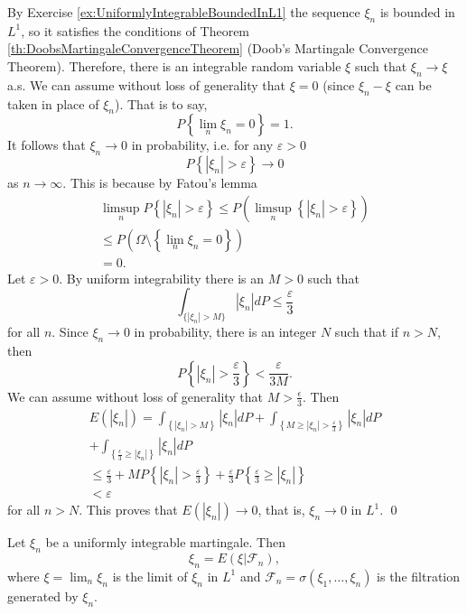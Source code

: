 \begin{Proof}
By Exercise \ref{ex:UniformlyIntegrableBoundedInL1} the sequence $\xi_{n}$ is bounded in $L^1$, so it satisfies the conditions of Theorem \ref{th:DoobsMartingaleConvergenceTheorem} (Doob's Martingale Convergence Theorem). Therefore, there is an integrable random variable $\xi$ such that $\xi_{n} \to \xi$ a.s. We can assume without loss of generality that $\xi = 0$ (since $\xi_{n} - \xi$ can be taken in place of $\xi_{n}$). That is to say,
\[
P \left\{\lim_{n} \xi_{n} = 0 \right\} = 1.
\]
It follows that $\xi_{n}\to 0$ in probability, i.e. for any $\varepsilon >0$
\[
P \left\{\left| \xi_{n} \right| > \varepsilon \right\}\rightarrow 0
\]
as $n \to \infty$. This is because by Fatou's lemma
\[
\begin{array}{l}
\limsup_{n} P \left\{\left| \xi_{n} \right| > \varepsilon \right\} \leq P \left(\limsup_{n} \left\{\left| \xi_{n} \right| > \varepsilon \right\}\right) \\
\leq P \left(\Omega \setminus \left\{\lim_{n} \xi_{n} = 0 \right\}\right) \\
= 0.
\end{array}
\]
Let $\varepsilon > 0$. By uniform integrability there is an $M > 0$ such that
\[
\int_{\{| \xi_{n} | > M \}} | \xi_{n} | d P \leq \frac{\varepsilon}{3}
\]
for all $n$. Since $\xi_n \to 0$ in probability, there is an integer $N$ such that if $n > N$, then
\[
P \left\{\left| \xi_{n} \right| > \frac{\varepsilon}{3} \right\} < \frac{\varepsilon}{3 M}.
\]
We can assume without loss of generality that $M > \frac{\epsilon}{3}$. Then
\[
\begin{array}{l}
E \left(\left| \xi_{n} \right|\right) = \int_{\left\{\left| \xi_{n} \right| > M \right\}} \left| \xi_{n} \right| d P + \int_{\left\{M \geq \left| \xi_{n} \right| > \frac{\varepsilon}{3} \right\}} \left| \xi_{n} \right| d P \\
+ \int_{\left\{\frac{\epsilon}{3} \geq | \xi_{n} | \right\}} | \xi_{n} | d P \\
\leq \frac{\varepsilon}{3} + M P \left\{\left| \xi_{n} \right| > \frac{\varepsilon}{3} \right\} + \frac{\varepsilon}{3} P \left\{\frac{\varepsilon}{3} \geq \left| \xi_{n} \right| \right\} \\
< \varepsilon
\end{array}
\]
for all $n > N$. This proves that $E(|\xi_n|) \to 0$, that is, $\xi_n \to 0$ in $L^1$. \qed
\end{Proof}

\begin{Theorem}
\label{th:MartingaleRepresentation}
Let $\xi_{n}$ be a uniformly integrable martingale. Then
\[
\xi_{n} = E (\xi | \mathcal{F}_{n}),
\]
where $\xi = \lim_{n} \xi_{n}$ is the limit of $\xi_{n}$ in $L^{1}$ and $\mathcal{F}_{n} = \sigma(\xi_{1}, \ldots, \xi_{n})$ is the filtration generated by $\xi_{n}$.
\end{Theorem}


